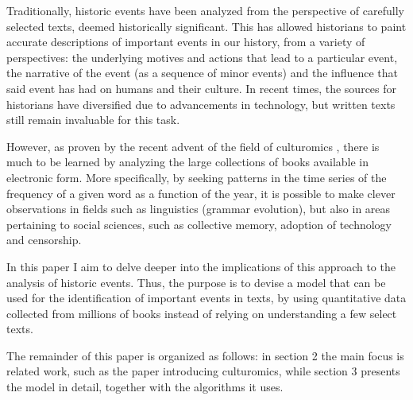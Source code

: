 
Traditionally, historic events have been analyzed from the perspective of carefully selected texts, deemed historically significant. This has allowed historians to paint accurate descriptions of important events in our history, from a variety of perspectives: the underlying motives and actions that lead to a particular event, the narrative of the event (as a sequence of minor events) and the influence that said event has had on humans and their culture. In recent times, the sources for historians have diversified due to advancements in technology, but written texts still remain invaluable for this task.

However, as proven by the recent advent of the field of culturomics \cite{Michel14012011}, there is much to be learned by analyzing the large collections of books available in electronic form. More specifically, by seeking patterns in the time series of the frequency of a given word as a function of the year, it is possible to make clever observations in fields such as linguistics (grammar evolution), but also in areas pertaining to social sciences, such as collective memory, adoption of technology and censorship.

In this paper I aim to delve deeper into the implications of this approach to the analysis of historic events. Thus, the purpose is to devise a model that can be used for the identification of important events in texts, by using quantitative data collected from millions of books instead of relying on understanding a few select texts.

The remainder of this paper is organized as follows: in section 2 the main focus is related work, such as the paper introducing culturomics, while section 3 presents the model in detail, together with the algorithms it uses.
